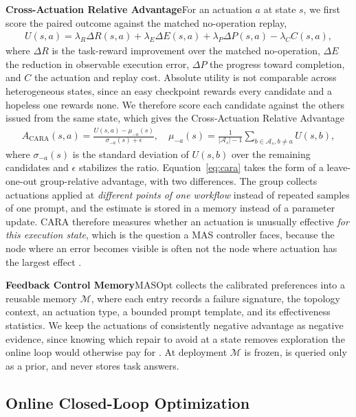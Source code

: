 \documentclass{article}
\theoremstyle{definition}
\begin{document}
\textbf{Cross-Actuation Relative Advantage}\quad For an actuation $a$ at state $s$, we first score the paired outcome against the matched no-operation replay,
\begin{gather}
    U(s,a) = \lambda_R \Delta R(s,a) + \lambda_E \Delta E(s,a) + \lambda_P \Delta P(s,a) - \lambda_C C(s,a), \label{eq:utility}
\end{gather}
where $\Delta R$ is the task-reward improvement over the matched no-operation, $\Delta E$ the reduction in observable execution error, $\Delta P$ the progress toward completion, and $C$ the actuation and replay cost. Absolute utility is not comparable across heterogeneous states, since an easy checkpoint rewards every candidate and a hopeless one rewards none. We therefore score each candidate against the others issued from the same state, which gives the Cross-Actuation Relative Advantage
\begin{gather}
    A_{\mathrm{CARA}}(s,a) = \frac{U(s,a) - \mu_{-a}(s)}{\sigma_{-a}(s) + \epsilon}, \quad \mu_{-a}(s) = \frac{1}{\left| \mathcal{A}_s \right| - 1} \sum\nolimits_{b \in \mathcal{A}_s, b \neq a} U(s,b), \label{eq:cara}
\end{gather}
where $\sigma_{-a}(s)$ is the standard deviation of $U(s,b)$ over the remaining candidates and $\epsilon$ stabilizes the ratio. Equation~\ref{eq:cara} takes the form of a leave-one-out group-relative advantage, with two differences. The group collects actuations applied at \emph{different points of one workflow} instead of repeated samples of one prompt, and the estimate is stored in a memory instead of a parameter update. CARA therefore measures whether an actuation is unusually effective \emph{for this execution state}, which is the question a MAS controller faces, because the node where an error becomes visible is often not the node where actuation has the largest effect \citep{mapro2026}.

\textbf{Feedback Control Memory}\quad MASOpt collects the calibrated preferences into a reusable memory $\mathcal{M}$, where each entry records a failure signature, the topology context, an actuation type, a bounded prompt template, and its effectiveness statistics. We keep the actuations of consistently negative advantage as negative evidence, since knowing which repair to avoid at a state removes exploration the online loop would otherwise pay for \citep{zhang2026memrl}. At deployment $\mathcal{M}$ is frozen, is queried only as a prior, and never stores task answers.

\subsection{Online Closed-Loop Optimization}
\label{sec:online}
\end{document}
